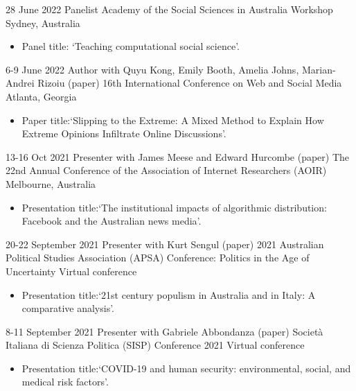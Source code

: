 \documentclass[11pt,a4paper,sans]{moderncv}
\begin{document}
\cventry %
{28 June 2022}
{Panelist}
{Academy of the Social Sciences in Australia Workshop}
{Sydney, Australia}
{}
       {
      \begin{itemize} %
        \item {Panel title: `Teaching computational social science'.}
      \end{itemize}
    }

\cventry %
{6-9 June 2022}
{Author with Quyu Kong, Emily Booth, Amelia Johns, Marian-Andrei Rizoiu (paper)}
{16th International Conference on Web and Social Media}
{Atlanta, Georgia}
{}
       {
      \begin{itemize} %
        \item {Paper title:`Slipping to the {Extreme}: {A} {Mixed} {Method} to {Explain} {How} {Extreme} {Opinions} {Infiltrate} {Online} {Discussions}'.}
      \end{itemize}
    }
    
\cventry %
{13-16 Oct 2021}
{Presenter with James Meese and Edward Hurcombe (paper)}
{The 22nd Annual Conference of the Association of Internet Researchers
  (AOIR)}
{Melbourne, Australia}
{}
       {
      \begin{itemize} %
        \item {Presentation title:`The institutional impacts of algorithmic distribution: Facebook and the Australian news media'.}
      \end{itemize}
    }

\cventry %
{20-22 September 2021}
{Presenter with Kurt Sengul (paper)}
{2021 Australian Political Studies Association (APSA) Conference: Politics in the Age of Uncertainty}
{Virtual conference}
{}
       {
      \begin{itemize} %
        \item {Presentation title:`21st century populism in Australia and in Italy: A comparative analysis'.}
      \end{itemize}
    }

 \cventry
    {8-11 September 2021}
    {Presenter with Gabriele Abbondanza (paper)}
    {Società Italiana di Scienza Politica (SISP) Conference 2021}
    {Virtual conference}{}
       {
      \begin{itemize} %
        \item {Presentation title:`COVID-19 and human security: environmental, social, and medical risk factors'.}
      \end{itemize}
    }
\end{document}
